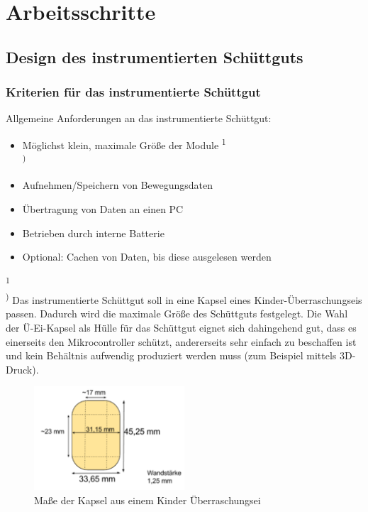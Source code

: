 {\large \section{Arbeitsschritte}


\subsection{Design des instrumentierten Schüttguts}

\subsubsection{Kriterien für das instrumentierte Schüttgut}

Allgemeine Anforderungen an das instrumentierte Schüttgut:

\begin{itemize}
	\item Möglichst klein, maximale Größe der Module \textsuperscript{1\\)}
	\item Aufnehmen/Speichern von Bewegungsdaten
	\item Übertragung von Daten an einen PC
	\item Betrieben durch interne Batterie
	\item Optional: Cachen von Daten, bis diese ausgelesen werden 
\end{itemize}

\textsuperscript{1\\)} Das instrumentierte Schüttgut soll in eine Kapsel eines Kinder-Überraschungseis passen. Dadurch wird die maximale Größe des Schüttguts festgelegt. Die Wahl der Ü-Ei-Kapsel als Hülle für das Schüttgut eignet sich dahingehend gut, dass es einerseits den Mikrocontroller schützt, andererseits sehr einfach zu beschaffen ist und kein Behältnis aufwendig produziert werden muss (zum Beispiel mittels 3D-Druck).

\begin{figure}[ht]
	\centering
	\includegraphics[width=0.5\textwidth]{images/k3-ueei.PNG}
	\caption {Maße der Kapsel aus einem Kinder Überraschungsei}
	\label{fig:k3}
\end{figure}

}
